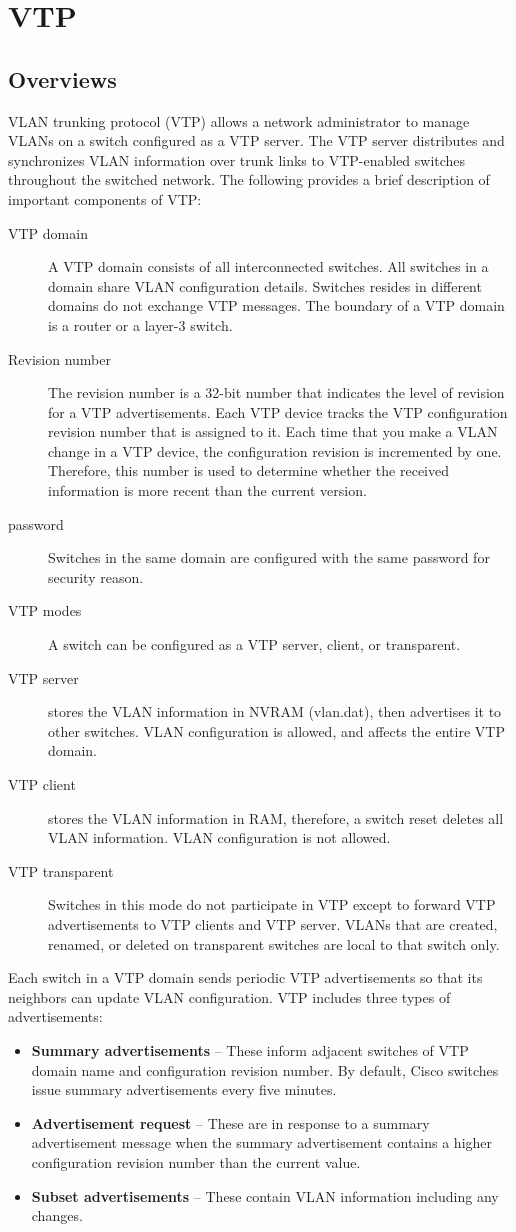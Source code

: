 \chapter{VTP}
\section{Overviews}
VLAN trunking protocol (VTP) allows a network administrator to manage VLANs on a switch configured as a VTP server. The VTP server distributes and synchronizes VLAN information over trunk links to VTP-enabled switches throughout the switched network. The following provides a brief description of important components of VTP:
\begin{description}
\item[VTP domain] A VTP domain consists of all interconnected switches. All switches in a domain share VLAN configuration details. Switches resides in different domains do not exchange VTP messages. The boundary of a VTP domain is a router or a layer-3 switch.
\item[Revision number] The revision number is a 32-bit number that indicates the level of revision for a VTP advertisements. Each VTP device tracks the VTP configuration revision number that is assigned to it. Each time that you make a VLAN change in a VTP device, the configuration revision is incremented by one. Therefore, this number is used to determine whether the received information is more recent than the current version.
\item[password] Switches in the same domain are configured with the same password for security reason.
\item[VTP modes] A switch can be configured as a VTP server, client, or transparent.
\item[VTP server] stores the VLAN information in NVRAM (vlan.dat), then advertises it to other switches. VLAN configuration is allowed, and affects the entire VTP domain.
\item[VTP client] stores the VLAN information in RAM, therefore, a switch reset deletes all VLAN information. VLAN configuration is not allowed.
\item[VTP transparent] Switches in this mode do not participate in VTP except to forward VTP advertisements to VTP clients and VTP server. VLANs that are created, renamed, or deleted on transparent switches are local to that switch only.
\end{description}
Each switch in a VTP domain sends periodic VTP advertisements so that its neighbors can update VLAN configuration. VTP includes three types of advertisements:
\begin{itemize}
\item \textbf{Summary advertisements} -- These inform adjacent switches of VTP domain name and configuration revision number. By default, Cisco switches issue summary advertisements every five minutes. 
\item \textbf{Advertisement request} -- These are in response to a summary advertisement message when the summary advertisement contains a higher configuration revision number than the current value.
\item \textbf{Subset advertisements} -- These contain VLAN information including any changes.
\end{itemize}
